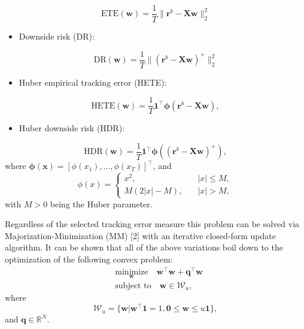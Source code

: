 \documentclass[]{article}
\providecommand{\tightlist}{%
  \setlength{\itemsep}{0pt}\setlength{\parskip}{0pt}}
\begin{document}
\[\begin{equation}\label{eq:ETE}
\text{ETE}(\mathbf{w}) = \frac{1}{T}\big\|\mathbf{r}^b - \mathbf{X}\mathbf{w}\big\|_2^2
\end{equation} \]

\begin{itemize}
\tightlist
\item
  Downside risk (DR):
\end{itemize}

\[\begin{equation}\label{eq:DR}
\text{DR}(\mathbf{w}) = \frac{1}{T}\big\|(\mathbf{r}^b-\mathbf{X}\mathbf{w})^+\big\|_2^2
\end{equation}\]

\begin{itemize}
\tightlist
\item
  Huber empirical tracking error (HETE):
\end{itemize}

\[\begin{equation}
\text{HETE}(\mathbf{w}) = \frac{1}{T}\mathbf{1}^\top\bm{\phi}\left(\mathbf{r}^b - \mathbf{X}\mathbf{w}\right),\label{eq:huber-ETE}
\end{equation}\]

\begin{itemize}
\tightlist
\item
  Huber downside risk (HDR):
\end{itemize}

\[\begin{equation}
\text{HDR}(\mathbf{w}) = \frac{1}{T}\mathbf{1}^\top\bm{\phi}\left((\mathbf{r}^b-\mathbf{X}\mathbf{w})^+\right),\label{eq:huber-DR}
\end{equation}\] where
\(\bm{\phi}(\mathbf{x}) = [\phi(x_1), \dots, \phi(x_T)]^\top\), and
\[\begin{equation}\label{eq:Huber}
\phi(x) = \begin{cases}
x^2, &\quad |x| \leq M,\\
M(2|x| - M), &\quad |x| > M,
\end{cases}
\end{equation}\] with \(M>0\) being the Huber parameter.

Regardless of the selected tracking error measure this problem can be
solved via Majorization-Minimization (MM) {[}2{]} with an iterative
closed-form update algorithm. It can be shown that all of the above
variations boil down to the optimization of the following convex
problem: \[\begin{equation}
\begin{aligned}\label{opt:general_form}
&\underset{\mathbf{w}}{\text{minimize}}\quad \mathbf{w}^\top\mathbf{w} + \mathbf{q}^\top\mathbf{w}\\
&\text{subject to}\quad \mathbf{w}\in\mathcal{W}_{u},
\end{aligned}
\end{equation}\] where \[\begin{equation}\label{eq:Wu}
\mathcal{W}_{u} = \big\{\mathbf{w} \big| \mathbf{w}^\top\mathbf{1} = 1, \mathbf{0}\leq\mathbf{w}\leq u\mathbf{1}\big\},
\end{equation}\] and \(\mathbf{q}\in\mathbb{R}^N\).
\end{document}
